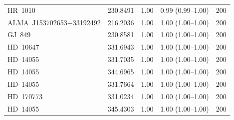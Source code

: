 \begin{tabular}{@{}l@{~~}r@{~~}r@{~~}l@{~~}r@{}}
HR~1010 & 230.8491 & 1.00 & 0.99 (0.99--1.00) & 200 \\
ALMA~J153702653$-$33192492 & 216.2036 & 1.00 & 1.00 (1.00--1.00) & 200 \\
GJ~849 & 230.8581 & 1.00 & 1.00 (1.00--1.00) & 200 \\
HD~10647 & 331.6943 & 1.00 & 1.00 (1.00--1.00) & 200 \\
HD~14055 & 331.7035 & 1.00 & 1.00 (1.00--1.00) & 200 \\
HD~14055 & 344.6965 & 1.00 & 1.00 (1.00--1.00) & 200 \\
HD~14055 & 331.7664 & 1.00 & 1.00 (1.00--1.00) & 200 \\
HD~170773 & 331.0234 & 1.00 & 1.00 (1.00--1.00) & 200 \\
HD~14055 & 345.4303 & 1.00 & 1.00 (1.00--1.00) & 200 \\
\hline
\end{tabular}
